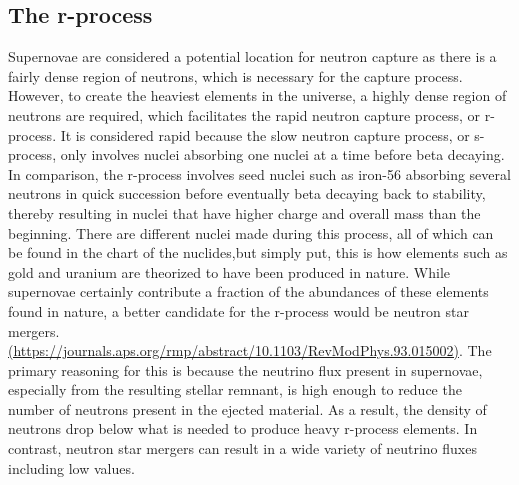 \documentclass[11pt,a4paper]{article}
\begin{document}
\subsection{The r-process}

Supernovae are considered a potential location for neutron capture as there is a fairly dense region of neutrons, which is necessary for the capture process. However, to create the heaviest elements in the universe, a highly dense region of neutrons are required, which facilitates the rapid neutron capture process, or r-process. It is considered rapid because the slow neutron capture process, or s-process, only involves nuclei absorbing one nuclei at a time before beta decaying. In comparison, the r-process involves seed nuclei such as iron-56 absorbing several neutrons in quick succession before eventually beta decaying back to stability, thereby resulting in nuclei that have higher charge and overall mass than the beginning. There are different nuclei made during this process, all of which can be found in the chart of the nuclides,but simply put, this is how elements such as gold and uranium are theorized to have been produced in nature. While supernovae certainly contribute a fraction of the abundances of these elements found in nature, a better candidate for the r-process would be neutron star mergers. \url{(https://journals.aps.org/rmp/abstract/10.1103/RevModPhys.93.015002)}. The primary reasoning for this is because the neutrino flux present in supernovae, especially from the resulting stellar remnant, is high enough to reduce the number of neutrons present in the ejected material. As a result, the density of neutrons drop below what is needed to produce heavy r-process elements. In contrast, neutron star mergers can result in a wide variety of neutrino fluxes including low values.
\end{document}

